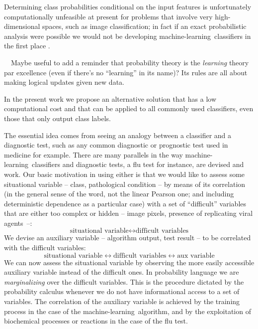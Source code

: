 \documentclass[\ifafour a4paper,12pt,\else a5paper,10pt,\fi%
onecolumn,oneside,article,%
british%
]{memoir}
\theoremstyle{remark}
\theoremstyle{innote}
\newcommand*{\puzzle}{{\fontencoding{U}\fontfamily{fontawesometwo}\selectfont\symbol{225}}}
\newcommand*{\wrench}{{\fontencoding{U}\fontfamily{fontawesomethree}\selectfont\symbol{114}}}
\newcommand{\mynotew}[1]{{\footnotesize\color{notecolour}\wrench\ #1}}
\renewcommand*{\|}[1][]{\nonscript\:#1\vert\nonscript\:\mathopen{}}
\newcommand*{\chaps}{chs}%
\newcommand*{\ml}{machine-learning}
\begin{document}
Determining class probabilities conditional on the input features is unfortunately computationally unfeasible at present for problems that involve very high-dimensional spaces, such as image classification; in fact if an exact probabilistic analysis were possible we would not be developing \ml\ classifiers in the first place \autocites[\chaps~2, 12]{russelletal1995_r2022}{pearl1988}.
\mynotew{\scriptsize\puzzle~Maybe useful to add a reminder that probability theory is the \emph{learning} theory par excellence (even if there's no \enquote{learning} in its name)? Its rules are all about making logical updates given new data.

}

In the present work we propose an alternative solution that has a low computational cost and that can be applied to all commonly used classifiers, even those that only output class labels.

The essential idea comes from seeing an analogy between a classifier and a diagnostic test, such as any common diagnostic or prognostic test used in medicine for example. There are many parallels in the way \ml\ classifiers and diagnostic tests, a flu test for instance, are devised and work. Our basic motivation in using either is that we would like to assess some situational variable -- class, pathological condition -- by means of its correlation (in the general sense of the word, not the linear Pearson one; and including deterministic dependence as a particular case) with a set of \enquote{difficult} variables that are either too complex or hidden -- image pixels, presence of replicating viral agents~--:
\[
  \text{situational variable} \longleftrightarrow \text{difficult variables}
\]
We devise an auxiliary variable -- algorithm output, test result -- to be correlated with the difficult variables:
\[
    \text{situational variable} \longleftrightarrow \text{difficult variables}
    \longleftrightarrow \text{aux variable}
\]
We can now assess the situational variable by observing the more easily accessible auxiliary variable instead of the difficult ones. In probability language we are \emph{marginalizing} over the difficult variables. This is the procedure dictated by the probability calculus whenever we do not have informational access to a set of variables. The correlation of the auxiliary variable is achieved by the training process in the case of the \ml\ algorithm, and by the exploitation of biochemical processes or reactions in the case of the flu test.
\end{document}
